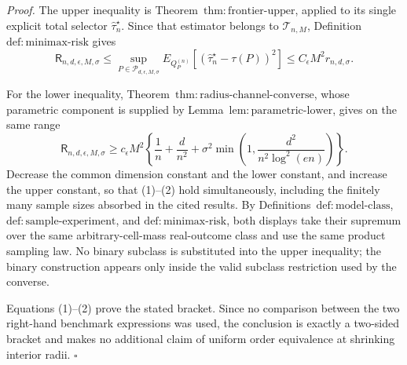 \textit{Proof.}
The upper inequality is Theorem~\(\mathrm{thm:frontier\text{-}upper}\), applied to its single explicit total selector \(\widehat\tau_n^\star\).  Since that estimator belongs to \(\mathcal T_{n,M}\), Definition~\(\mathrm{def:minimax\text{-}risk}\) gives
\[
\mathsf R_{n,d,\epsilon,M,\sigma}
\le
\sup_{P\in\mathcal P_{d,\epsilon,M,\sigma}}
E_{Q_P^{(n)}}[(\widehat\tau_n^\star-\tau(P))^2]
\le C_\epsilon M^2r_{n,d,\sigma}.
\tag{1}
\]

For the lower inequality, Theorem~\(\mathrm{thm:radius\text{-}channel\text{-}converse}\), whose parametric component is supplied by Lemma~\(\mathrm{lem:parametric\text{-}lower}\), gives on the same range
\[
\mathsf R_{n,d,\epsilon,M,\sigma}
\ge c_\epsilon M^2\left\{
\frac1n+\frac d{n^2}
+\sigma^2\min\left(1,
\frac{d^2}{n^2\log^2(en)}\right)
\right\}.
\tag{2}
\]
Decrease the common dimension constant and the lower constant, and increase the upper constant, so that (1)--(2) hold simultaneously, including the finitely many sample sizes absorbed in the cited results.  By Definitions~\(\mathrm{def:model\text{-}class}\), \(\mathrm{def:sample\text{-}experiment}\), and \(\mathrm{def:minimax\text{-}risk}\), both displays take their supremum over the same arbitrary-cell-mass real-outcome class and use the same product sampling law.  No binary subclass is substituted into the upper inequality; the binary construction appears only inside the valid subclass restriction used by the converse.

Equations (1)--(2) prove the stated bracket.  Since no comparison between the two right-hand benchmark expressions was used, the conclusion is exactly a two-sided bracket and makes no additional claim of uniform order equivalence at shrinking interior radii. \(\square\)